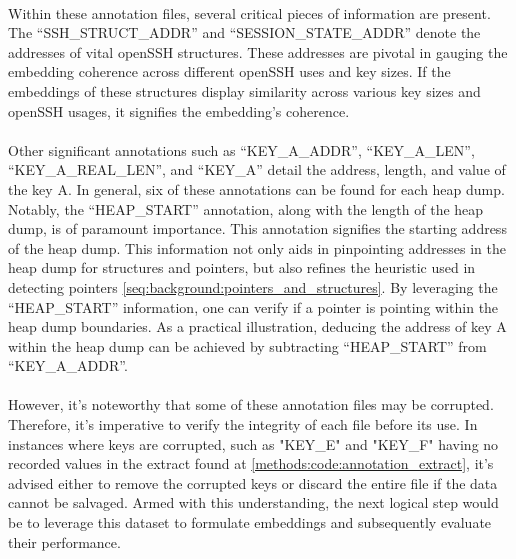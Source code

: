             \paragraph{}Within these annotation files, several critical pieces of information are present. The ``SSH\_STRUCT\_ADDR'' and ``SESSION\_STATE\_ADDR'' denote the addresses of vital openSSH \glspl{structure}. These addresses are pivotal in gauging the embedding coherence across different openSSH uses and key sizes. If the embeddings of these \glspl{structure} display similarity across various key sizes and openSSH usages, it signifies the embedding's coherence.

            \paragraph{}Other significant annotations such as ``KEY\_A\_ADDR'', ``KEY\_A\_LEN'', ``KEY\_A\_REAL\_LEN'', and ``KEY\_A'' detail the address, length, and value of the key A. In general, six of these annotations can be found for each heap dump. Notably, the ``HEAP\_START'' annotation, along with the length of the heap dump, is of paramount importance. This annotation signifies the starting address of the heap dump. This information not only aids in pinpointing addresses in the heap dump for \glspl{structure} and \glspl{pointer}, but also refines the heuristic used in detecting \glspl{pointer} \ref{seq:background:pointers_and_structures}. By leveraging the ``HEAP\_START'' information, one can verify if a \gls{pointer} is pointing within the heap dump boundaries. As a practical illustration, deducing the address of key A within the heap dump can be achieved by subtracting ``HEAP\_START'' from ``KEY\_A\_ADDR''.

            \paragraph{}However, it's noteworthy that some of these annotation files may be corrupted. Therefore, it's imperative to verify the integrity of each file before its use. In instances where keys are corrupted, such as "KEY\_E" and "KEY\_F" having no recorded values in the extract found at \ref{methods:code:annotation_extract}, it's advised either to remove the corrupted keys or discard the entire file if the data cannot be salvaged. Armed with this understanding, the next logical step would be to leverage this dataset to formulate embeddings and subsequently evaluate their performance.

